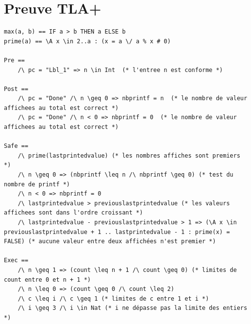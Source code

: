 \documentclass{scrreprt}
\begin{document}
\section{Preuve TLA+}
\begin{lstlisting}
max(a, b) == IF a > b THEN a ELSE b
prime(a) == \A x \in 2..a : (x = a \/ a % x # 0)

Pre ==
    /\ pc = "Lbl_1" => n \in Int  (* l'entree n est conforme *)

Post ==
    /\ pc = "Done" /\ n \geq 0 => nbprintf = n  (* le nombre de valeur affichees au total est correct *)
    /\ pc = "Done" /\ n < 0 => nbprintf = 0  (* le nombre de valeur affichees au total est correct *)

Safe ==
    /\ prime(lastprintedvalue) (* les nombres affiches sont premiers *)
    /\ n \geq 0 => (nbprintf \leq n /\ nbprintf \geq 0) (* test du nombre de printf *)
    /\ n < 0 => nbprintf = 0
    /\ lastprintedvalue > previouslastprintedvalue (* les valeurs affichees sont dans l'ordre croissant *)
    /\ lastprintedvalue - previouslastprintedvalue > 1 => (\A x \in previouslastprintedvalue + 1 .. lastprintedvalue - 1 : prime(x) = FALSE) (* aucune valeur entre deux affichées n'est premier *)

Exec ==
    /\ n \geq 1 => (count \leq n + 1 /\ count \geq 0) (* limites de count entre 0 et n + 1 *)
    /\ n \leq 0 => (count \geq 0 /\ count \leq 2)
    /\ c \leq i /\ c \geq 1 (* limites de c entre 1 et i *)
    /\ i \geq 3 /\ i \in Nat (* i ne dépasse pas la limite des entiers *)
\end{lstlisting}
\end{document}
